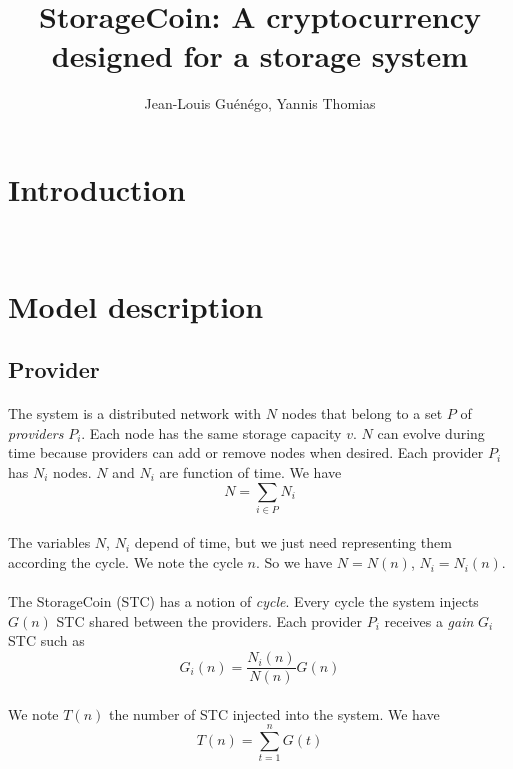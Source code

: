 \documentclass[a4paper,12pt]{article}
\title{StorageCoin: A cryptocurrency designed for a storage system}
\author{Jean-Louis Gu\'{e}n\'{e}go, Yannis Thomias}
\date{}
\begin{document}
\maketitle
\tableofcontents

\section{Introduction}
~\cite{bitcoin}
~\cite{peercoin}
~\cite{smallcell}

\section{Model description}
\subsection{Provider}

\paragraph*{}
The system is a distributed network with $N$ nodes that belong to a set $P$ of \emph{providers} $P_{i}$.
Each node has the same storage capacity $v$.
$N$ can evolve during time because providers can add or remove nodes  when desired. Each provider $P_{i}$ has $N_{i}$ nodes.
$N$ and $N_{i}$ are function of time. We have 
\[N=\sum\limits_{i\in{P}}N_{i}\]

\paragraph*{}
The variables $N$, $N_{i}$ depend of time, but we just need representing them according the cycle. We note the cycle $n$.
So we have $N=N(n)$, $N_{i}=N_{i}(n)$. 

\paragraph*{}
The StorageCoin (STC) has a notion of \emph{cycle}.
Every cycle the system injects $G(n)$ STC shared between the providers.
Each provider $P_{i}$ receives a \emph{gain} $G_{i}$ STC such as
\[G_{i}(n)=\frac{N_{i}(n)}{N(n)}G(n)\]

\paragraph*{}
We note $T(n)$ the number of STC injected into the system. We have
\[T(n)=\sum\limits_{t=1}^{n}G(t)\]
\end{document}
